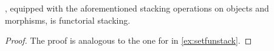 %
\begin{lemma}
    \PosL, equipped with the aforementioned stacking operations on objects and morphisms, is functorial stacking.
\end{lemma}
%
\begin{proof}
    The proof is analogous to the one for \SetL in \cref{ex:setfunstack}.
\end{proof}
